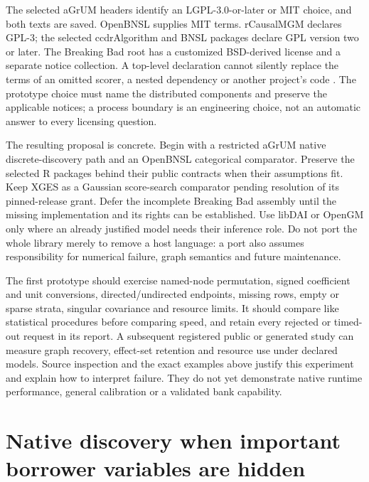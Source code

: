 The selected aGrUM headers identify an LGPL-3.0-or-later or MIT choice, and
both texts are saved. OpenBNSL supplies MIT terms. rCausalMGM declares GPL-3;
the selected ccdrAlgorithm and BNSL packages declare GPL version two or
later. The Breaking Bad root has a customized BSD-derived license and a
separate notice collection. A top-level declaration cannot silently replace
the terms of an omitted scorer, a nested dependency or another project's
code \citep{exec13_cxx_agrum,exec13_cxx_openbnsl,exec13_cxx_rcausalmgm,
exec13_cxx_ccdr,exec13_cxx_bnsl,exec13_cxx_breaking}. The prototype choice
must name the distributed components and preserve the applicable notices;
a process boundary is an engineering choice, not an automatic answer to
every licensing question.

The resulting proposal is concrete. Begin with a restricted aGrUM native
discrete-discovery path and an OpenBNSL categorical comparator. Preserve
the selected R packages behind their public contracts when their assumptions
fit. Keep XGES as a Gaussian score-search comparator pending resolution of
its pinned-release grant. Defer the incomplete Breaking Bad assembly until
the missing implementation and its rights can be established. Use libDAI or
OpenGM only where an already justified model needs their inference role.
Do not port the whole library merely to remove a host language: a port also
assumes responsibility for numerical failure, graph semantics and future
maintenance.

The first prototype should exercise named-node permutation, signed
coefficient and unit conversions, directed/undirected endpoints, missing
rows, empty or sparse strata, singular covariance and resource limits. It
should compare like statistical procedures before comparing speed, and
retain every rejected or timed-out request in its report. A subsequent
registered public or generated study can measure graph recovery, effect-set
retention and resource use under declared models. Source inspection and the
exact examples above justify this experiment and explain how to interpret
failure. They do not yet demonstrate native runtime performance, general
calibration or a validated bank capability.
\label{exec13:cxx-discovery-end}


\section{Native discovery when important borrower variables are hidden}
\label{exec14:cxx-latent}

